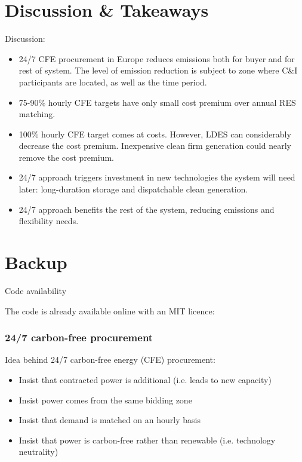 \section{Discussion \& Takeaways}


\begin{frame}{Discussion:}

  \begin{itemize}
  \item 24/7 CFE procurement in Europe \alert{reduces emissions} both for buyer and for rest of system. The level of emission reduction is subject to zone where C\&I participants are located, as well as the time period.
  \item 75-90\% hourly CFE targets have \alert{only small cost premium} over annual RES matching.
  \item 100\% hourly CFE target \alert{comes at costs}. However, LDES can considerably decrease the cost premium. Inexpensive clean firm generation could nearly remove the cost premium.   
  \item 24/7 approach \alert{triggers investment in new technologies} the system will need later: long-duration storage and dispatchable clean generation.
  \item 24/7 approach \alert{benefits the rest of the system}, reducing emissions and flexibility needs.
  \end{itemize}

\end{frame}

\section*{Backup}

\begin{frame}{Code availability}

  The code is already available online with an MIT licence:


\end{frame}


\begin{frame}
  \frametitle{24/7 carbon-free procurement}

  Idea behind \alert{24/7 carbon-free energy (CFE)} procurement:

  \begin{itemize}
  \item Insist that contracted power is \alert{additional} (i.e. leads to new capacity)
  \item Insist power comes from the \alert{same bidding zone}
   \item Insist that demand is matched on an \alert{hourly basis}
    \item Insist that power is \alert{carbon-free} rather than renewable (i.e. technology neutrality)
  \end{itemize}

\end{frame}


